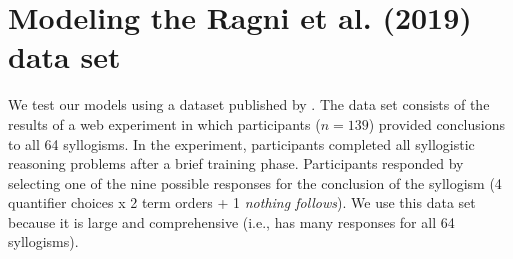 \documentclass[floatsintext, doc]{apa6}
\newcommand{\ndg}[1]{{\textcolor{Green}{[ndg: #1]}}}
\begin{document}
%
%
%
%



%





\section{Modeling the Ragni et al. (2019) data set}

We test our models using a dataset published by . 
The data set consists of the results of a web experiment in which participants ($n = 139$) provided conclusions to all 64 syllogisms. In the experiment, participants completed all syllogistic reasoning problems after a brief training phase. Participants responded by selecting one of the nine possible responses for the conclusion of the syllogism (4 quantifier choices x 2 term orders + 1 \emph{nothing follows}). 
We use this data set because it is large and comprehensive (i.e., has many responses for all 64 syllogisms). 
\end{document}
